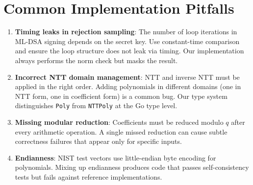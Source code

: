 \section{Common Implementation Pitfalls}


\begin{enumerate}
  \item \textbf{Timing leaks in rejection sampling}: The number of loop iterations in
    ML-DSA signing depends on the secret key. Use constant-time comparison and ensure
    the loop structure does not leak via timing. Our implementation always performs the
    norm check but masks the result.

  \item \textbf{Incorrect NTT domain management}: NTT and inverse NTT must be applied in
    the right order. Adding polynomials in different domains (one in NTT form, one in
    coefficient form) is a common bug. Our type system distinguishes \texttt{Poly} from
    \texttt{NTTPoly} at the Go type level.

  \item \textbf{Missing modular reduction}: Coefficients must be reduced modulo $q$ after
    every arithmetic operation. A single missed reduction can cause subtle correctness
    failures that appear only for specific inputs.

  \item \textbf{Endianness}: NIST test vectors use little-endian byte encoding for
    polynomials. Mixing up endianness produces code that passes self-consistency tests
    but fails against reference implementations.
\end{enumerate}

